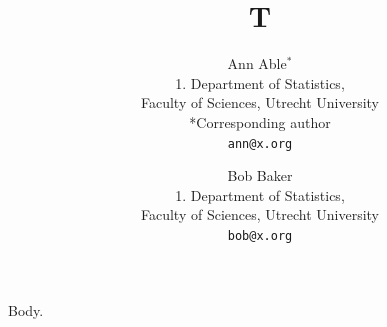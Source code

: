 \documentclass{article}
\begin{document}
\title{T}
\author{Ann Able$^*$\\
{1. Department of Statistics, \\Faculty of Sciences, Utrecht University}\\
{*Corresponding author}\\
\texttt{ann@x.org}
\and Bob Baker\\
{1. Department of Statistics, \\Faculty of Sciences, Utrecht University}\\
\texttt{bob@x.org}}
\maketitle
Body.
\end{document}
